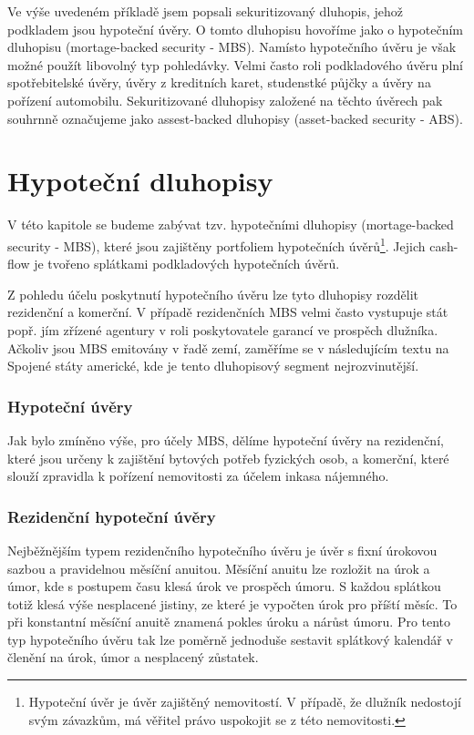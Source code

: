 \documentclass[a4paper]{book}
\begin{document}
Ve výše uvedeném příkladě jsem popsali sekuritizovaný dluhopis, jehož podkladem jsou hypoteční úvěry. O tomto dluhopisu hovoříme jako o hypotečním dluhopisu (mortage-backed security - MBS). Namísto hypotečního úvěru je však možné použít libovolný typ pohledávky. Velmi často roli podkladového úvěru plní spotřebitelské úvěry, úvěry z kreditních karet, studenstké půjčky a úvěry na pořízení automobilu. Sekuritizované dluhopisy založené na těchto úvěrech pak souhrnně označujeme jako assest-backed dluhopisy (asset-backed security - ABS).

\section{Hypoteční dluhopisy}

V této kapitole se budeme zabývat tzv. hypotečními dluhopisy (mortage-backed security - MBS), které jsou zajištěny portfoliem hypotečních úvěrů\footnote{Hypoteční úvěr je úvěr zajištěný nemovitostí. V případě, že dlužník nedostojí svým závazkům, má věřitel právo uspokojit se z této nemovitosti.}. Jejich cash-flow je tvořeno splátkami podkladových hypotečních úvěrů.

Z pohledu účelu poskytnutí hypotečního úvěru lze tyto dluhopisy rozdělit rezidenční a komerční. V případě rezidenčních MBS velmi často vystupuje stát popř. jím zřízené agentury v roli poskytovatele garancí ve prospěch dlužníka. Ačkoliv jsou MBS emitovány v řadě zemí, zaměříme se v následujícím textu na Spojené státy americké, kde je tento dluhopisový segment nejrozvinutější.

\subsubsection{Hypoteční úvěry}

Jak bylo zmíněno výše, pro účely MBS, dělíme hypoteční úvěry na rezidenční, které jsou určeny k zajištění bytových potřeb fyzických osob, a komerční, které slouží zpravidla k pořízení nemovitosti za účelem inkasa nájemného. 

\subsubsection{Rezidenční hypoteční úvěry}

Nejběžnějším typem rezidenčního hypotečního úvěru je úvěr s fixní úrokovou sazbou a pravidelnou měsíční anuitou. Měsíční anuitu lze rozložit na úrok a úmor, kde s postupem času klesá úrok ve prospěch úmoru. S každou splátkou totiž klesá výše nesplacené jistiny, ze které je vypočten úrok pro příští měsíc. To při konstantní měsíční anuitě znamená pokles úroku a nárůst úmoru. Pro tento typ hypotečního úvěru tak lze poměrně jednoduše sestavit splátkový kalendář v členění na úrok, úmor a nesplacený zůstatek.
\end{document}
